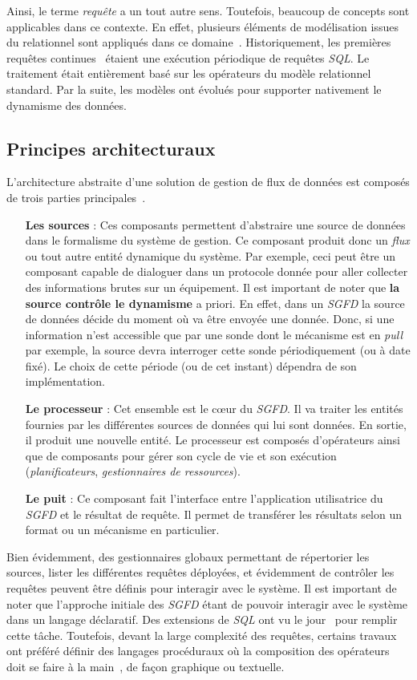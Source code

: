 Ainsi, le terme \textit{requête} a un tout autre sens. Toutefois, beaucoup de concepts sont applicables dans ce contexte. En effet, plusieurs éléments de modélisation issues du relationnel sont appliqués dans ce domaine~\cite{Arasu:semantic}. Historiquement, les premières requêtes continues~\cite{Terry:tapestry} étaient une exécution périodique de requêtes \textit{SQL}. Le traitement était entièrement basé sur les opérateurs du modèle relationnel standard. Par la suite, les modèles ont évolués pour supporter nativement le dynamisme des données.

\subsection{Principes architecturaux}
L'architecture abstraite d'une solution de gestion de flux de données est composés de trois parties principales~\cite{Duller:virtualdsms}.
\begin{itemize}
 \item[\textbf{Les sources}] : Ces composants permettent d'abstraire une source de données dans le formalisme du système de gestion. Ce composant produit donc un \textit{flux} ou tout autre entité dynamique du système. Par exemple, ceci peut être un composant capable de dialoguer dans un protocole donnée pour aller collecter des informations brutes sur un équipement. Il est important de noter que \textbf{la source contrôle le dynamisme} a priori. En effet, dans un \textit{SGFD} la source de données décide du moment où va être envoyée une donnée. Donc, si une information n'est accessible que par une sonde dont le mécanisme est en \textit{pull} par exemple, la source devra interroger cette sonde périodiquement (ou à date fixé). Le choix de cette période (ou de cet instant) dépendra de son implémentation.
 \item[\textbf{Le processeur}] : Cet ensemble est le cœur du \textit{SGFD}. Il va traiter les entités fournies par les différentes sources de données qui lui sont données. En sortie, il produit une nouvelle entité. Le processeur est composés d'opérateurs ainsi que de composants pour gérer son cycle de vie et son exécution (\textit{planificateurs}, \textit{gestionnaires de ressources}).
 \item[\textbf{Le puit}] : Ce composant fait l'interface entre l'application utilisatrice du \textit{SGFD} et le résultat de requête. Il permet de transférer les résultats selon un format ou un mécanisme en particulier.
\end{itemize}
Bien évidemment, des gestionnaires globaux permettant de répertorier les sources, lister les différentes requêtes déployées, et évidemment de contrôler les requêtes peuvent être définis pour interagir avec le système. Il est important de noter que l'approche initiale des \textit{SGFD} étant de pouvoir interagir avec le système dans un langage déclaratif. Des extensions de \textit{SQL} ont vu le jour~\cite{Arasu:cql, Chandrasekaran:telegraphcq} pour remplir cette tâche. Toutefois, devant la large complexité des requêtes, certains travaux ont préféré définir des langages procéduraux où la composition des opérateurs doit se faire à la main~\cite{Abadi:aurora, Gurgen:sstreamware}, de façon graphique ou textuelle.

